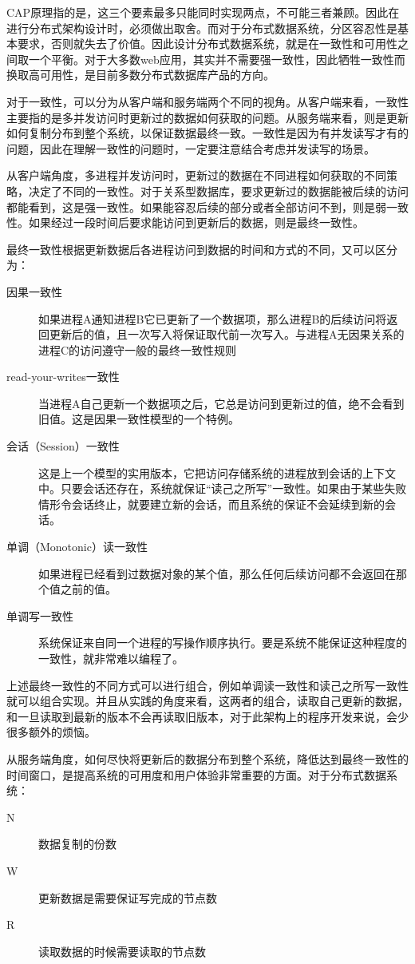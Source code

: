 CAP原理指的是，这三个要素最多只能同时实现两点，不可能三者兼顾。因此在进行分布式架构设计时，必须做出取舍。而对于分布式数据系统，分区容忍性是基本要求，否则就失去了价值。因此设计分布式数据系统，就是在一致性和可用性之间取一个平衡。对于大多数web应用，其实并不需要强一致性，因此牺牲一致性而换取高可用性，是目前多数分布式数据库产品的方向。

对于一致性，可以分为从客户端和服务端两个不同的视角。从客户端来看，一致性主要指的是多并发访问时更新过的数据如何获取的问题。从服务端来看，则是更新如何复制分布到整个系统，以保证数据最终一致。一致性是因为有并发读写才有的问题，因此在理解一致性的问题时，一定要注意结合考虑并发读写的场景。

从客户端角度，多进程并发访问时，更新过的数据在不同进程如何获取的不同策略，决定了不同的一致性。对于关系型数据库，要求更新过的数据能被后续的访问都能看到，这是强一致性。如果能容忍后续的部分或者全部访问不到，则是弱一致性。如果经过一段时间后要求能访问到更新后的数据，则是最终一致性。

最终一致性根据更新数据后各进程访问到数据的时间和方式的不同，又可以区分为：
\begin{description}
\item[因果一致性]如果进程A通知进程B它已更新了一个数据项，那么进程B的后续访问将返回更新后的值，且一次写入将保证取代前一次写入。与进程A无因果关系的进程C的访问遵守一般的最终一致性规则
\item[read-your-writes一致性]当进程A自己更新一个数据项之后，它总是访问到更新过的值，绝不会看到旧值。这是因果一致性模型的一个特例。 
\item[会话（Session）一致性]这是上一个模型的实用版本，它把访问存储系统的进程放到会话的上下文中。只要会话还存在，系统就保证“读己之所写”一致性。如果由于某些失败情形令会话终止，就要建立新的会话，而且系统的保证不会延续到新的会话。 
\item[单调（Monotonic）读一致性]如果进程已经看到过数据对象的某个值，那么任何后续访问都不会返回在那个值之前的值。
\item[单调写一致性]系统保证来自同一个进程的写操作顺序执行。要是系统不能保证这种程度的一致性，就非常难以编程了。
\end{description}

上述最终一致性的不同方式可以进行组合，例如单调读一致性和读己之所写一致性就可以组合实现。并且从实践的角度来看，这两者的组合，读取自己更新的数据，和一旦读取到最新的版本不会再读取旧版本，对于此架构上的程序开发来说，会少很多额外的烦恼。

从服务端角度，如何尽快将更新后的数据分布到整个系统，降低达到最终一致性的时间窗口，是提高系统的可用度和用户体验非常重要的方面。对于分布式数据系统：
\begin{description}
\item [N] 数据复制的份数 
\item [W] 更新数据是需要保证写完成的节点数 
\item [R] 读取数据的时候需要读取的节点数
\end{description}

